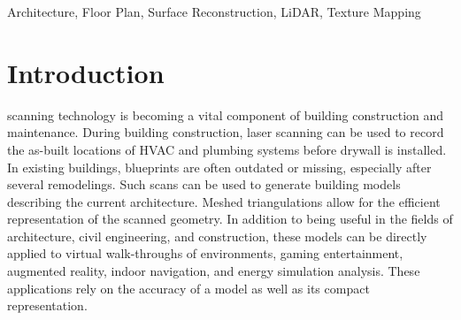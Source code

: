 \documentclass[10pt,twocolumn,twoside]{IEEEtran}
\begin{document}
\begin{IEEEkeywords}
Architecture, Floor Plan, Surface Reconstruction, LiDAR, Texture Mapping
\end{IEEEkeywords}

\section{Introduction}
\label{sec:introduction}

 scanning technology is becoming a vital component of building construction and maintenance.  During building construction, laser scanning can be used to record the as-built locations of HVAC and plumbing systems before drywall is installed.  In existing buildings, blueprints are often outdated or missing, especially after several remodelings.  Such scans can be used to generate building models describing the current architecture.  Meshed triangulations allow for the efficient representation of the scanned geometry.  In addition to being useful in the fields of architecture, civil engineering, and construction, these models can be directly applied to virtual walk-throughs of environments, gaming entertainment, augmented reality, indoor navigation, and energy simulation analysis.  These applications rely on the accuracy of a model as well as its compact representation.
\end{document}
